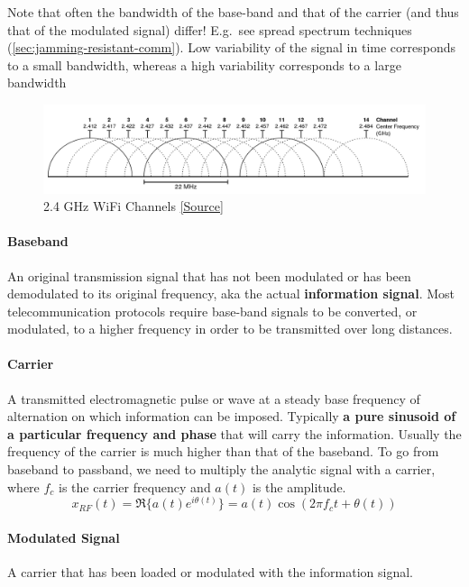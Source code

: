 Note that often the bandwidth of the base-band and that of the carrier (and thus that of the modulated signal) differ!
E.g.\ see spread spectrum techniques (\autoref{sec:jamming-resistant-comm}).
Low variability of the signal in time corresponds to a small bandwidth, whereas a high variability corresponds to a large bandwidth

\begin{figure}[h]
	\centering
	\includegraphics[scale=0.35]{images/1-wifi-channels.png}
	\caption{2.4 GHz WiFi Channels \href{https://en.wikipedia.org/wiki/List\_of\_WLAN\_channels\#/media/File:2.4\_GHz\_Wi-Fi\_channels\_(802.11b,g_WLAN).svg}{[Source]}}%
	\label{fig:wifi-channels}
\end{figure}

\paragraph{Baseband}
An original transmission signal that has not been modulated or has been demodulated to its original frequency, aka the actual \textbf{information signal}.
Most telecommunication protocols require base-band signals to be converted, or modulated, to a higher frequency in order to be transmitted over long distances.

\paragraph{Carrier}
A transmitted electromagnetic pulse or wave at a steady base frequency of alternation on which information can be imposed.
Typically \textbf{a pure sinusoid of a particular frequency and phase} that will carry the information.
Usually the frequency of the carrier is much higher than that of the baseband.
To go from baseband to passband, we need to multiply the analytic signal with a carrier, where $f_c$ is the carrier frequency and $a(t)$ is the amplitude. 
\[ x_{RF} (t) = \Re \{a(t)e^{i\theta (t)}\} = a(t) \cos (2 \pi f_c t + \theta(t))\]

\paragraph{Modulated Signal}
A carrier that has been loaded or modulated with the information signal.

